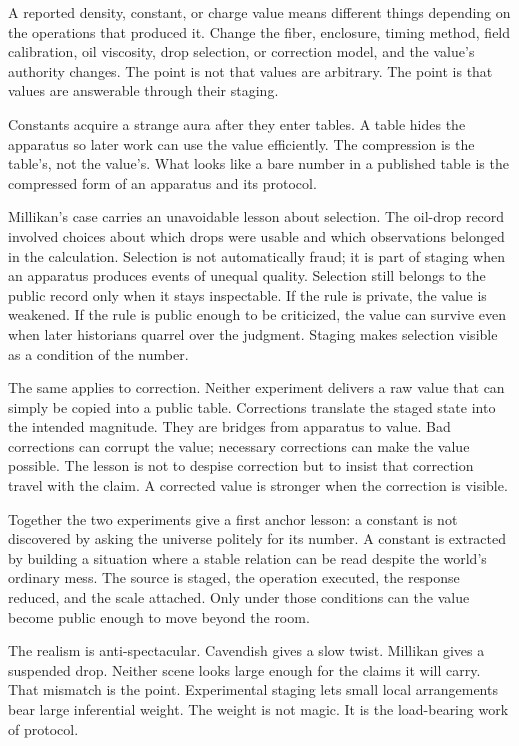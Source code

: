 A reported density, constant, or charge value means different things
depending on the operations that produced it. Change the fiber, enclosure,
timing method, field calibration, oil viscosity, drop selection, or
correction model, and the value's authority changes. The point is not that
values are arbitrary. The point is that values are answerable through their
staging.

Constants acquire a strange aura after they enter tables. A table hides the
apparatus so later work can use the value efficiently. The compression is
the table's, not the value's. What looks like a bare number in a published
table is the compressed form of an apparatus and its protocol.

Millikan's case carries an unavoidable lesson about selection. The oil-drop
record involved choices about which drops were usable and which observations
belonged in the calculation. Selection is not automatically fraud; it is
part of staging when an apparatus produces events of unequal quality.
Selection still belongs to the public record only when it stays inspectable.
If the rule is private, the value is weakened. If the rule is public enough
to be criticized, the value can survive even when later historians quarrel
over the judgment. Staging makes selection visible as a condition of the
number.

The same applies to correction. Neither experiment delivers a raw value that
can simply be copied into a public table. Corrections translate the staged
state into the intended magnitude. They are bridges from apparatus to value.
Bad corrections can corrupt the value; necessary corrections can make the
value possible. The lesson is not to despise correction but to insist that
correction travel with the claim. A corrected value is stronger when the
correction is visible.

Together the two experiments give a first anchor lesson: a constant is not
discovered by asking the universe politely for its number. A constant is
extracted by building a situation where a stable relation can be read
despite the world's ordinary mess. The source is staged, the operation
executed, the response reduced, and the scale attached. Only under those
conditions can the value become public enough to move beyond the room.

The realism is anti-spectacular. Cavendish gives a slow twist. Millikan
gives a suspended drop. Neither scene looks large enough for the claims it
will carry. That mismatch is the point. Experimental staging lets small
local arrangements bear large inferential weight. The weight is not magic.
It is the load-bearing work of protocol.

